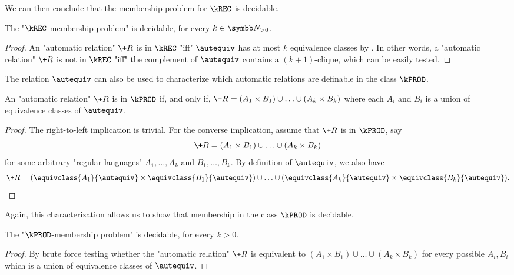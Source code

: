 We can then conclude that the membership problem for $\kREC$ is decidable. 

\begin{corollary}
    The "$\kREC$-membership problem" is decidable, for every $k \in \Np$.
\end{corollary}
\begin{proof}
    An "automatic relation" $\+R$ is in $\kREC$ "iff" $\autequiv$ has at most $k$ equivalence classes by . 
    In other words, a "automatic relation" $\+R$ is not in $\kREC$ "iff" the complement of $\autequiv$ contains a $(k+1)$-clique, which can be easily tested.
\end{proof}

The relation $\autequiv$ can also be used to characterize which automatic relations are definable in the class $\kPROD$.

\begin{proposition}
    An "automatic relation" $\+R$ is in $\kPROD$ if, and only if, $\+R=(A_1 \times B_1) \cup \hdots \cup (A_k \times B_k)$ where each $A_i$ and $B_i$ is a union of equivalence classes of $\autequiv$.
\end{proposition}
\begin{proof}
    The right-to-left implication is trivial. For the converse implication,
    assume that $\+R$ is in $\kPROD$, say
    \[
        \+R=(A_1 \times B_1) \cup \hdots \cup (A_k \times B_k)
    \]
    for some arbitrary "regular languages" $A_1,\hdots,A_k$ and $B_1,\hdots,B_k$.
    By definition of $\autequiv$, we also have
    \[
        \+R=(\equivclass{A_1}{\autequiv} \times \equivclass{B_1}{\autequiv})
        \cup \hdots \cup (\equivclass{A_k}{\autequiv} \times \equivclass{B_k}{\autequiv}).\qedhere
    \]
\end{proof}

Again, this characterization allows us to show that membership in the class $\kPROD$ is decidable. 

\begin{corollary}
    The "$\kPROD$-membership problem" is decidable, for every $k > 0$.
\end{corollary}

\begin{proof}
    By brute force testing whether the "automatic relation" $\+R$ is equivalent to $(A_1 \times B_1) \cup \hdots \cup (A_k \times B_k)$ for every possible $A_i,B_i$ which is a union of equivalence classes of $\autequiv$.
\end{proof}
